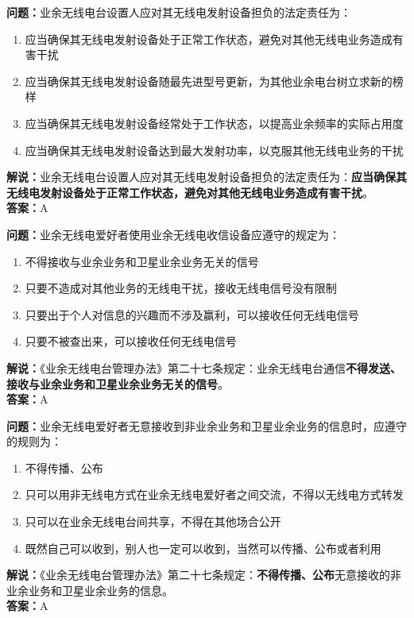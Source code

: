 \documentclass{ctexbook}
\begin{document}
\bigskip


\noindent\textbf{问题：}业余无线电台设置人应对其无线电发射设备担负的法定责任为：
\begin{enumerate}[label=\Alph*), leftmargin=3em]
	\item 应当确保其无线电发射设备处于正常工作状态，避免对其他无线电业务造成有害干扰
	\item 应当确保其无线电发射设备随最先进型号更新，为其他业余电台树立求新的榜样
	\item 应当确保其无线电发射设备经常处于工作状态，以提高业余频率的实际占用度
	\item 应当确保其无线电发射设备达到最大发射功率，以克服其他无线电业务的干扰
\end{enumerate}
\noindent\textbf{解说：}业余无线电台设置人应对其无线电发射设备担负的法定责任为：\textbf{应当确保其无线电发射设备处于正常工作状态，避免对其他无线电业务造成有害干扰}。\\\noindent\textbf{答案：}A


\bigskip


\noindent\textbf{问题：}业余无线电爱好者使用业余无线电收信设备应遵守的规定为：
\begin{enumerate}[label=\Alph*), leftmargin=3em]
	\item 不得接收与业余业务和卫星业余业务无关的信号
	\item 只要不造成对其他业务的无线电干扰，接收无线电信号没有限制
	\item 只要出于个人对信息的兴趣而不涉及赢利，可以接收任何无线电信号
	\item 只要不被查出来，可以接收任何无线电信号
\end{enumerate}
\noindent\textbf{解说：}《业余无线电台管理办法》第二十七条规定：业余无线电台通信\textbf{不得发送、接收与业余业务和卫星业余业务无关的信号}。\\\noindent\textbf{答案：}A



\bigskip


\noindent\textbf{问题：}业余无线电爱好者无意接收到非业余业务和卫星业余业务的信息时，应遵守的规则为：
\begin{enumerate}[label=\Alph*), leftmargin=3em]
	\item 不得传播、公布
	\item 只可以用非无线电方式在业余无线电爱好者之间交流，不得以无线电方式转发
	\item 只可以在业余无线电台间共享，不得在其他场合公开
	\item 既然自己可以收到，别人也一定可以收到，当然可以传播、公布或者利用
\end{enumerate}
\noindent\textbf{解说：}《业余无线电台管理办法》第二十七条规定：\textbf{不得传播、公布}无意接收的非业余业务和卫星业余业务的信息。\\\noindent\textbf{答案：}A
\end{document}
